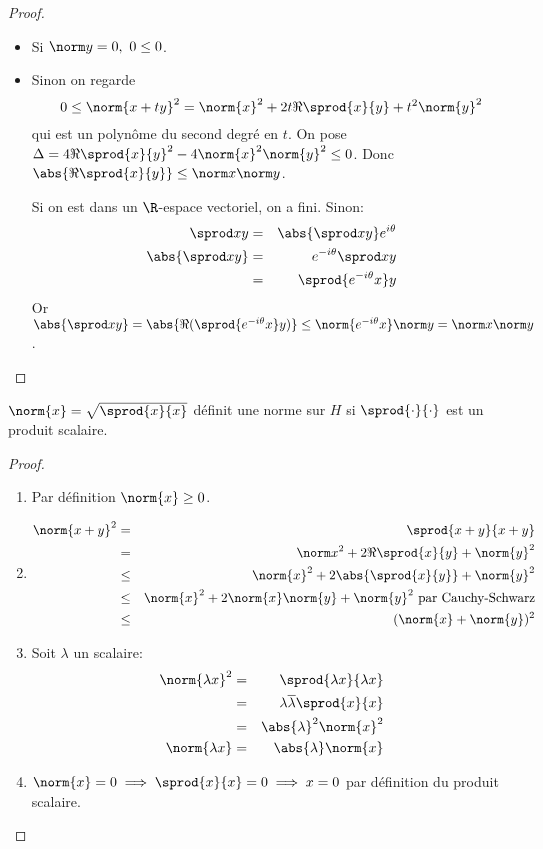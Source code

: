 \begin{proof}
	\begin{itemize}
		\item Si $\norm y = 0, \ 0 \leq 0$.
		\item Sinon on regarde
		      $$ 0 \leq \norm{x + ty}^2 = \norm{x}^2 + 2t\Re \sprod{x}{y} + t^2 \norm{y}^2 $$
		      qui est un polynôme du second degré en $t$.
		      On pose $\Delta = 4\Re \sprod{x}{y}^2 - 4\norm{x}^2\norm{y}^2 \leq 0$.
		      Donc $\abs{\Re \sprod{x}{y}} \leq \norm x \norm y$.

		      Si on est dans un $\R$-espace vectoriel, on a fini. Sinon:
		      \begin{eqnarray*}
			      \sprod x y &=& \abs{\sprod x y} e^{i\theta} \\
			      \abs{\sprod x y} &=& e^{-i\theta} \sprod x y \\
			      &=&    \sprod {e^{-i\theta} x} y
		      \end{eqnarray*}
		      Or $\abs{\sprod x y} = \abs {\Re ( \sprod {e^{-i\theta} x} y )} \leq \norm {e^{-i\theta} x} \norm y = \norm x \norm y$.
	\end{itemize}
\end{proof}


\begin{coro}
	$\norm{x} = \sqrt{\sprod{x}{x}}$ définit une norme sur $H$ si $\sprod{\cdot}{\cdot}$ est un produit scalaire.
\end{coro}

\begin{proof}
	\begin{enumerate}
		\item Par définition $\norm{x} \geq 0$.
		\item \begin{eqnarray*}
			      \norm{x + y}^2 &=& \sprod{x+y}{x+y} \\
			      &=&\norm x^2 + 2\Re \sprod{x}{y} + \norm{y}^2 \\
			      &\leq& \norm{x}^2 + 2\abs{\sprod{x}{y}} + \norm{y}^2 \\
			      &\leq& \norm{x}^2 + 2\norm{x}\norm{y} + \norm{y}^2 \text{ par Cauchy-Schwarz} \\
			      &\leq& (\norm{x} + \norm{y})^2
		      \end{eqnarray*}
		\item Soit $\lambda$ un scalaire:
		      \begin{eqnarray*}
			      \norm{\lambda x}^2 &=& \sprod{\lambda x}{\lambda x} \\
			      &=&\lambda \overline \lambda \sprod{x}{x} \\
			      &=& \abs{\lambda}^2 \norm{x}^2 \\
			      \norm{\lambda x} &=& \abs{\lambda} \norm{x}
		      \end{eqnarray*}
		\item $\norm{x} = 0 \implies \sprod{x}{x} = 0 \implies x = 0$ par définition du produit scalaire.
	\end{enumerate}
\end{proof}

